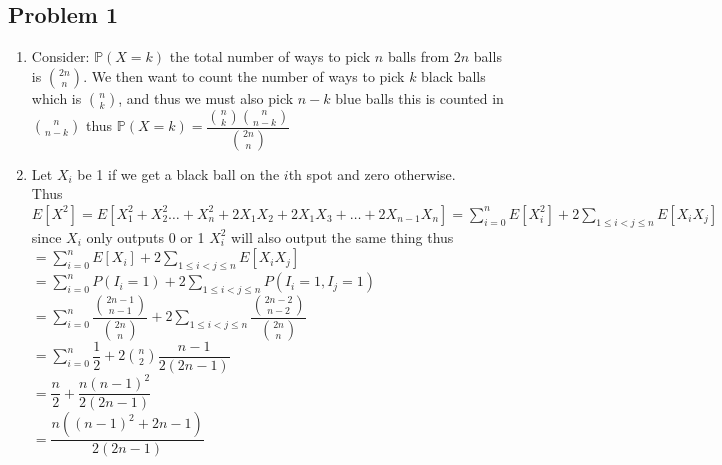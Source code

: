 \documentclass[12pt, letterpaper]{article}
\theoremstyle{definition}
\renewcommand{\P}{\mathbb{P}}
\begin{document}
\pagestyle{fancy}
\fancyhf{}
\fancyhead[ROE]{\thepage}

\subsection*{Problem 1}
\begin{enumerate}
    \item Consider: $\P(X=k)$ the total number of ways to pick $n$ balls from $2n$ balls is $\binom{2n}{n}$. 
    We then want to count the number of ways to pick $k$ black balls which is $\binom{n}{k}$, and thus we must also pick $n-k$ blue balls this is counted in $\binom{n}{n-k}$ thus
    $\P(X=k)=\dfrac{\binom{n}{k}\binom{n}{n-k}}{\binom{2n}{n}}$
    \item Let $X_i$ be 1 if we get a black ball on the $i$th spot and zero otherwise.\\
    Thus $E[X^2]=E[X_1^2+X_2^2\dots+X_n^2+2X_1X_2+2X_1X_3+\dots+2X_{n-1}X_n]=\sum\limits_{i=0}^nE[X_i^2]+2\sum\limits_{1 \leq i < j \leq n}E[X_iX_j]$\\
    since $X_i$ only outputs 0 or 1 $X_i^2$ will also output the same thing thus\\
    $=\sum\limits_{i=0}^nE[X_i]+2\sum\limits_{1 \leq i < j \leq n}E[X_iX_j]$\\
    $=\sum\limits_{i=0}^nP(I_i=1)+2\sum\limits_{1 \leq i < j \leq n}P(I_i=1, I_j=1)$\\
    $=\sum\limits_{i=0}^n\dfrac{\binom{2n-1}{n-1}}{\binom{2n}{n}}+2\sum\limits_{1 \leq i < j \leq n}\dfrac{\binom{2n-2}{n-2}}{\binom{2n}{n}}$\\
    $=\sum\limits_{i=0}^n \dfrac{1}{2}+2\binom{n}{2}\dfrac{n-1}{2(2n-1)}$\\
    $=\dfrac{n}{2}+\dfrac{n(n-1)^2}{2(2n-1)}$\\
    $=\dfrac{n((n-1)^2+2n-1)}{2(2n-1)}$
\end{enumerate}

\newpage
\end{document}
